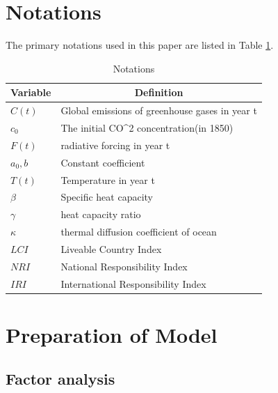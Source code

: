 \documentclass[12pt]{article}  %
\begin{document}
\section{Notations}
The primary notations used in this paper are listed in Table \ref{Notations}.
\begin{table}[htbp]
  \centering
  \caption{Notations}
    \begin{tabular}{ll}
    \toprule
    \multicolumn{1}{c}{Variable} & \multicolumn{1}{c}{Definition} \\
    \midrule
    $C(t)$  & Global emissions of greenhouse gases in year t \\
    
    $c_0$    & The initial CO^2 concentration(in 1850) \\
    $F(t)$  & radiative forcing in year t \\
    $a_0,b$  & \textcolor[rgb]{ .133,  .133,  .133}{Constant coefficient} \\
    $T(t)$  & \textcolor[rgb]{ .2,  .2,  .2}{Temperature in year t} \\
    $\beta$  & Specific heat capacity \\
    $\gamma$ & heat capacity ratio  \\
    $\kappa$ & \multicolumn{1}{p{25.555em}}{thermal diffusion coefficient of ocean} \\
    $LCI$   & Liveable Country Index \\
    $NRI$   & \textcolor[rgb]{ .133,  .133,  .133}{National Responsibility Index} \\
    $IRI$   & International Responsibility Index \\
    \toprule
    \end{tabular}%
  \label{Notations}%
\end{table}%



\section{Preparation of Model}




\subsection{Factor analysis}
\end{document}
